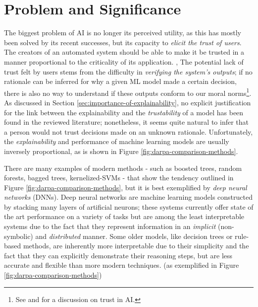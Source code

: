 \section{Problem and Significance}
The biggest problem of AI is no longer its perceived utility, as this has mostly been solved by its recent successes, but its capacity to \textit{elicit the trust of users}.
The creators of an automated system should be able to make it be trusted in a manner proportional to the criticality of its application. \citep{gilpin2018explaining}, \citep{abdul2018trends}
The potential lack of trust felt by users stems from the difficulty in \textit{verifying the system's outputs}; if no rationale can be inferred for why a given ML model made a certain decision, there is also no way to understand if these outputs conform to our moral norms\footnote{See \citet{gilpin2018explaining} and \citet{abdul2018trends} for a discussion on trust in AI.}.
As discussed in Section \ref{sec:importance-of-explainability}, no explicit justification for the link between the explainability and the \textit{trustability} of a model has been found in the reviewed literature; nonetheless, it seems quite natural to infer that a person would not trust decisions made on an unknown rationale. 
Unfortunately, the \textit{explainability} and performance of machine learning models are usually inversely proportional, as is shown in Figure \ref{fig:darpa-comparison-methods}.

There are many examples of modern methods - such as boosted trees, random forests, bagged trees, kernelized-SVMs - that show the tendency outlined in Figure \ref{fig:darpa-comparison-methods}, but it is best exemplified by \textit{deep neural networks} (DNNs). 
Deep neural networks are machine learning models constructed by stacking many layers of artificial neurons; these systems currently offer state of the art performance on a variety of tasks but are among the least interpretable systems due to the fact that they represent information in an \textit{implicit} (non-symbolic) and \textit{distributed} manner.  
Some older models, like decision trees or rule-based methods, are inherently more interpretable due to their simplicity and the fact that they can explicitly demonstrate their reasoning steps, but are less accurate and flexible than more modern techniques. \citep{Biran2017} (as exemplified in Figure \ref{fig:darpa-comparison-methods})

